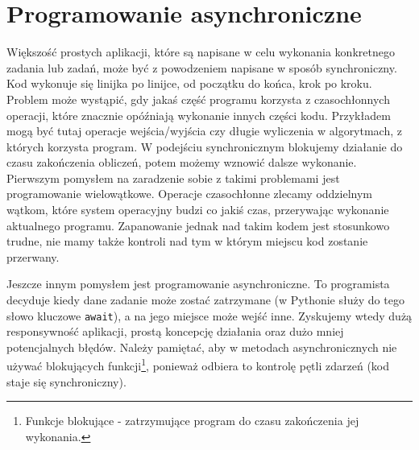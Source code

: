 \documentclass[shortabstract,inz]{iithesis}
\begin{document}
		\section{Programowanie asynchroniczne}
			Większość prostych aplikacji, które są napisane w celu wykonania konkretnego zadania lub zadań, może być z powodzeniem napisane w sposób synchroniczny. Kod wykonuje się linijka po linijce, od początku do końca, krok po kroku. Problem może wystąpić, gdy jakaś część programu korzysta z czasochłonnych operacji, które znacznie opóźniają wykonanie innych części kodu. Przykładem mogą być tutaj operacje wejścia/wyjścia czy długie wyliczenia w algorytmach, z których korzysta program. W podejściu synchronicznym blokujemy działanie do czasu zakończenia obliczeń, potem możemy wznowić dalsze wykonanie. Pierwszym pomysłem na zaradzenie sobie z takimi problemami jest programowanie wielowątkowe. Operacje czasochłonne zlecamy oddzielnym wątkom, które system operacyjny budzi co jakiś czas, przerywając wykonanie aktualnego programu. Zapanowanie jednak nad takim kodem jest stosunkowo trudne, nie mamy także kontroli nad tym w którym miejscu kod zostanie przerwany.
		
			Jeszcze innym pomysłem jest programowanie asynchroniczne. To programista decyduje kiedy dane zadanie może zostać zatrzymane (w Pythonie służy do tego słowo kluczowe \texttt{await}), a na jego miejsce może wejść inne. Zyskujemy wtedy dużą responsywność aplikacji, prostą koncepcję działania oraz dużo mniej potencjalnych błędów. Należy pamiętać, aby w metodach asynchronicznych nie używać blokujących funkcji\footnote{Funkcje blokujące - zatrzymujące program do czasu zakończenia jej wykonania.}, ponieważ odbiera to kontrolę pętli zdarzeń (kod staje się synchroniczny).
		
\end{document}
